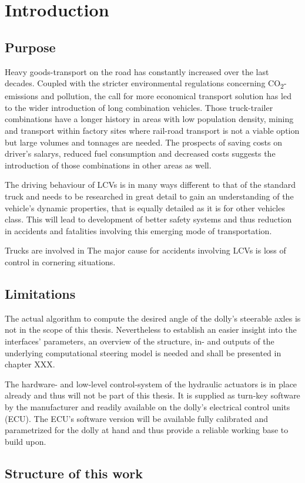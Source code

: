 \documentclass[ExampleMasters.tex]{subfiles}
\begin{document}
\clearpage	
\chapter{Introduction}
\label{chap:introduction}

\section{Purpose}
\label{sec:purpose}
Heavy goods-transport on the road has constantly increased over the last decades. Coupled with the stricter environmental regulations concerning CO\textsubscript{2}-emissions and pollution, the call for more economical transport solution has led to the wider introduction of long combination vehicles. Those truck-trailer combinations have a longer history in areas with low population density, mining and transport within factory sites where rail-road transport is not a viable option but large volumes and tonnages are needed. The prospects of saving costs on driver's salarys, reduced fuel consumption and decreased costs suggests the introduction of those combinations in other areas as well. 

The driving behaviour of LCVs is in many ways different to that of the standard truck and needs to be researched in great detail to gain an understanding of the vehicle's dynamic properties, that is equally detailed as it is for other vehicles class. This will lead to development of better safety systems and thus reduction in accidents and fatalities involving this emerging mode of transportation. 

Trucks are involved in The major cause for accidents involving LCVs is loss of control in cornering situations.

\section{Limitations}
\label{sec:limitations}
The actual algorithm to compute the desired angle of the dolly's steerable axles is not in the scope of this thesis. Nevertheless to establish an easier insight into the interfaces' parameters, an overview of the structure, in- and outputs of the underlying computational steering model is needed and shall be presented in chapter XXX. 

The hardware- and low-level control-system of the hydraulic actuators is in place already and thus will not be part of this thesis. It is supplied as turn-key software by the manufacturer and readily available on the dolly's electrical control units (ECU). The ECU's software version will be available fully calibrated and parametrized for the dolly at hand and thus provide a reliable working base to build upon. 


\section{Structure of this work}
\label{sec:structure}
\end{document}
